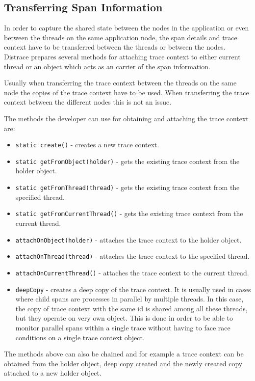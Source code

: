 \subsection{Transferring Span Information}
In order to capture the shared state between the nodes in the application or even between the threads on the same application node, the span details and trace context have to be transferred between the threads or between the nodes. Distrace prepares several methods for attaching trace context to either current thread or an object which acts as an carrier of the span information.

Usually when transferring the trace context between the threads on the same node the copies of the trace context have to be used. When transferring the trace context between the different nodes this is not an issue.

The methods the developer can use for obtaining and attaching the trace context are:
\begin{itemize}
	\item \texttt{static create()} - creates a new trace context.
	\item \texttt{static getFromObject(holder)} - gets the existing trace context from the holder object.
	\item \texttt{static getFromThread(thread)} - gets the existing trace context from the specified thread.
	\item \texttt{static getFromCurrentThread()} -  gets the existing trace context from the current thread.
	\item \texttt{attachOnObject(holder)} - attaches the trace context to the holder object.
	\item \texttt{attachOnThread(thread)} - attaches the trace context to the specified \newline thread.
	\item \texttt{attachOnCurrentThread()} - attaches the trace context to the current \newline thread.
	\item \texttt{deepCopy} - creates a deep copy of the trace context. It is usually used in cases where child spans are processes in parallel by multiple threads. In this case, the copy of trace context with the same id is shared among all these threads, but they operate on very own object. This is done in order to be able to monitor parallel spans within a single trace without having to face race conditions on a single trace context object.
\end{itemize}
The methods above can also be chained and for example a trace context can be obtained from the holder object, deep copy created and the newly created copy attached to a new holder object.

